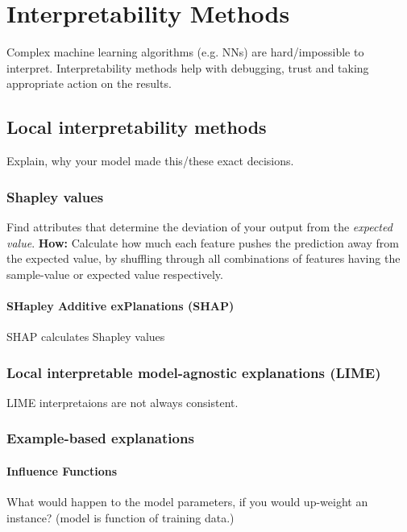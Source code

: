 \documentclass[main.tex]{subfiles}
\begin{document}
\section{Interpretability Methods}
Complex machine learning algorithms (e.g. NNs) are hard/impossible to interpret. Interpretability methods help with debugging, trust and taking appropriate action on the results.

\subsection{Local interpretability methods}
Explain, why your model made this/these exact decisions. 

\subsubsection{Shapley values}
Find attributes that determine the deviation of your output from the \textit{expected value}. \textbf{How:} Calculate how much each feature pushes the prediction away from the expected value, by shuffling through all combinations of features having the sample-value or expected value respectively. \\
\paragraph{SHapley Additive exPlanations (SHAP)}
SHAP calculates Shapley values %

\subsubsection{Local interpretable model-agnostic explanations (LIME)}
\attention LIME interpretaions are not always consistent. %

\subsubsection{Example-based explanations}
\paragraph{Influence Functions}
What would happen to the model parameters, if you would up-weight an instance? (model is function of training data.)
\end{document}
